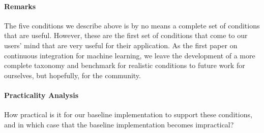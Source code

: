 \documentclass{article}
\begin{document}
\paragraph*{Remarks} The five conditions we describe
above is by no means a complete set of conditions
that are useful. However, these are 
the first set of conditions that come to our users'
mind that are very useful for their application. 
As the first paper on continuous integration for
machine learning, we leave the development of 
a more complete taxonomy and benchmark for 
realistic conditions to future work for ourselves,
but hopefully, for the community.

\paragraph*{Practicality Analysis} How practical
is it for our baseline implementation to support
these conditions, and in which case that 
the baseline implementation becomes impractical?
\end{document}
